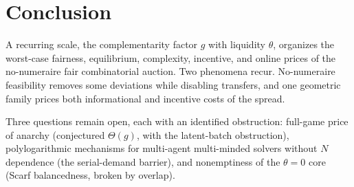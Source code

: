 \documentclass{llncs}
\begin{document}
\section{Conclusion}\label{sec:conclusion}

A recurring scale, the complementarity factor $g$ with liquidity
$\theta$, organizes the worst-case fairness, equilibrium, complexity,
incentive, and online prices of the no-numeraire fair combinatorial
auction. Two phenomena recur. No-numeraire feasibility
removes some deviations while disabling transfers, and one geometric
family prices both informational and incentive costs of the spread.

Three questions remain open, each with an identified obstruction:
full-game price of anarchy (conjectured $\Theta(g)$, with the latent-batch
obstruction), polylogarithmic mechanisms for multi-agent multi-minded
solvers without $N$ dependence (the serial-demand barrier), and
nonemptiness of the $\theta=0$ core (Scarf balancedness, broken by
overlap).




\appendix

\end{document}
